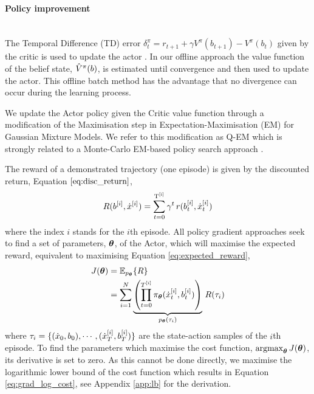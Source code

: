 \paragraph{Policy improvement}\\

The Temporal Difference (TD) error $\delta^{\pi}_t = r_{t+1} + \gamma V^{\pi}(b_{t+1}) - V^{\pi}(b_t)$ 
given by the critic is used to update the actor  \cite[Chap. 6]{sutton1998reinforcement}. 
In our offline approach the value function of the belief state, $\hat{V}^{\pi}(b)$, is estimated 
until convergence and then used to update the actor. This offline batch 
method has the advantage that no divergence can occur during the learning process.

We update the Actor policy given the Critic value function through a modification of the Maximisation step in  Expectation-Maximisation (EM) 
for Gaussian Mixture Models. We refer to this modification as Q-EM which is strongly related to a Monte-Carlo EM-based policy 
search approach \cite[p.50]{p_search_surv_2011}. 

The reward of a demonstrated trajectory (one episode) is given by the discounted return, Equation $\ref{eq:disc_return}$,
\begin{equation}\label{eq:disc_return}
 R(b^{[i]},\dot{x}^{[i]}) = \sum_{t=0}^{\mathrm{T^{[i]}}} \gamma^t \, r(b^{[i]}_t,\dot{x}^{[i]}_t)
\end{equation}
where the index $i$ stands for the $i$th episode.
All policy gradient approaches seek to find a set of parameters, $\boldsymbol{\theta}$, of the Actor,
which will maximise the expected reward, equivalent to maximising Equation \ref{eq:expected_reward},
\begin{align}\label{eq:expected_reward}
 J(\boldsymbol{\theta}) &= \mathbb{E}_{p_{\boldsymbol{\theta}}}\{R\} \nonumber \\
	  &= \sum\limits_{i=1}^{N}   \underbrace{\left( \prod_{t=0}^{T^{[i]}} \pi_{\boldsymbol{\theta}}(\dot{x}^{[i]}_t,b^{[i]}_t) \right)}_{p_{\boldsymbol{\theta}}(\tau_i)} \, R(\tau_i) 
\end{align}
where $\tau_i = \{(\dot{x}_0,b_0),\cdots,(\dot{x}_T^{[i]},b_T^{[i]}) \}$ are the state-action samples of the $i$th episode.
To find the parameters which maximise the cost function, $\argmax_{\Param} J(\Param)$, its derivative is set to zero. 
As this cannot be done directly, we maximise the logarithmic lower bound of the cost function which results in 
Equation \ref{eq:grad_log_cost}, see Appendix \ref{app:lb} for the derivation.

